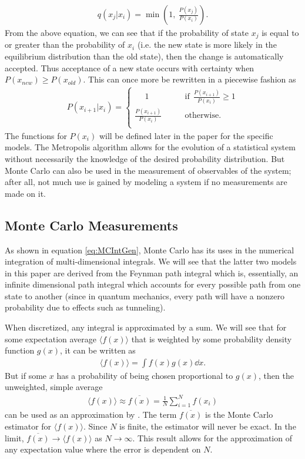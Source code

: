 \documentclass[11pt]{article}
\begin{document}
\begin{align}
	q(x_j|x_i)=\min\left(1,\ \frac{P(x_j)}{P(x_i)}\right).
\end{align}
From the above equation, we can see that if the probability of state $x_j$ is equal to or greater than the probability of $x_i$ (i.e. the new state is more likely in the equilibrium distribution than the old state), then the change is automatically accepted. Thus acceptance of a new state occurs with certainty when $P(x_{new})\geq P(x_{old})$. This can once more be rewritten in a piecewise fashion as
\begin{align}
P(x_{i+1}|x_i)=\begin{cases}
\quad\ 1\qquad&\text{if}\ \ \displaystyle{\frac{P(x_{i+1})}{P(x_i)}\geq1}\\
\displaystyle{\frac{P(x_{i+1})}{P(x_i)}}\qquad&\text{otherwise.}\\
\end{cases}
\end{align}
The functions for $P(x_i)$ will be defined later in the paper for the specific models.
The Metropolis algorithm allows for the evolution of a statistical system without necessarily the knowledge of the desired probability distribution. But Monte Carlo can also be used in the measurement of observables of the system; after all, not much use is gained by modeling a system if no measurements are made on it.

\subsection{Monte Carlo Measurements}
As shown in equation \ref{eq:MCIntGen}, Monte Carlo has its uses in the numerical integration of multi-dimensional integrals. We will see that the latter two models in this paper are derived from the Feynman path integral which is, essentially, an infinite dimensional path integral which accounts for every possible path from one state to another (since in quantum mechanics, every path will have a nonzero probability due to effects such as tunneling).

When discretized, any integral is approximated by a sum. We will see that for some expectation average $\langle f(x)\rangle$ that is weighted by some probability density function $g(x)$, it can be written as
\begin{align}
	\langle f(x)\rangle=\int f(x)g(x)\dd{x}.
\end{align}
But if some $x$ has a probability of being chosen proportional to $g(x)$, then the unweighted, simple average
\begin{align}
	\langle f(x)\rangle\approx\overline{f(x)}=\frac{1}{N}\sum_{i=1}^Nf(x_i)
	\label{eq:MCExp}
\end{align}
can be used as an approximation by \cite{MainPaper}. The term $\overline{f(x)}$ is the Monte Carlo estimator for $\langle f(x)\rangle$. Since $N$ is finite, the estimator will never be exact. In the limit, $\overline{f(x)}\to\langle f(x)\rangle$ as $N\to\infty$. This result allows for the approximation of any expectation value where the error is dependent on $N$.
\end{document}
